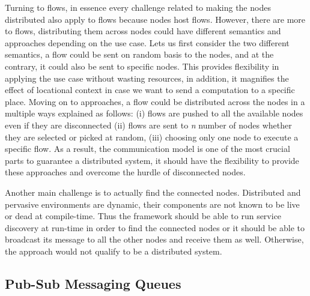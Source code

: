 
Turning to flows, in essence every challenge related to making the nodes distributed also apply to flows because nodes host flows. However, there are more to flows, distributing them across nodes could have different semantics and approaches depending on the use case.
 Lets us first consider the two different semantics, a flow could be sent on random basis to the nodes, and at the contrary, it could also be sent to specific nodes. This provides flexibility in applying the use case without wasting resources, in addition, it magnifies the effect of locational context in case we want to send a computation to a specific place.
 Moving on to approaches, a flow could be distributed across the nodes in a multiple ways explained as follows: (i) flows are pushed to all the available nodes even if they are disconnected (ii) flows are sent to \textit{n} number of nodes whether they are selected or picked at random, (iii) choosing only one node to execute a specific flow. As a result, the communication model is one of the most crucial parts to guarantee a distributed system, it should have the flexibility to provide these approaches and overcome the hurdle of disconnected nodes.
 

Another main challenge is to actually find the connected nodes. Distributed and pervasive environments are dynamic, their components are not known to be live or dead at compile-time. Thus the framework should be able to run service discovery at run-time in order to find the connected nodes or it should be able to broadcast its message to all the other nodes and receive them as well. Otherwise, the approach would not qualify to be a distributed system. 




\newpage

\subsection{Pub-Sub Messaging Queues}

